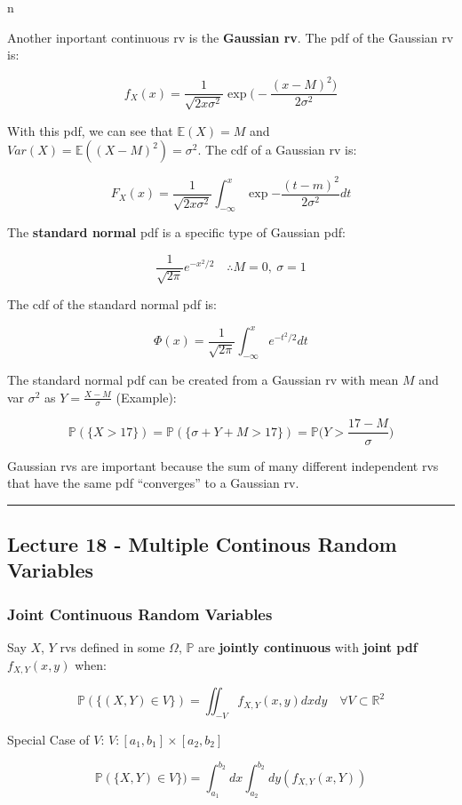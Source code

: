 n\documentclass{article}
\begin{document}
Another inportant continuous rv is the \textbf{Gaussian rv}. The pdf
of the Gaussian rv is:

\[
  f_X(x) = \frac{1} {\sqrt{2x\sigma^2}}
  \exp{\bigg(-\frac{(x-M)^2\bigg)} {2\sigma^2}}
\]

With this pdf, we can see that $\mathbb{E}(X) = M$ and $Var(X) =
\mathbb{E}((X-M)^2) = \sigma^2$. The cdf of a Gaussian rv is:

\[
  F_X(x) = \frac{1} {\sqrt{2x\sigma^2}} \int_{-\infty}^x
  \exp{-\frac{(t-m)^2}{2\sigma^2}} dt
\]

The \textbf{standard normal} pdf is a specific type of Gaussian pdf:

\[
  \frac{1}{\sqrt{2\pi}} e^{-x^2/2} \quad \therefore M=0, \ \sigma=1
\]

The cdf of the standard normal pdf is:

\[
  \Phi(x) = \frac{1}{\sqrt{2\pi}} \int_{-\infty}^x e^{-t^2/2} dt
\]

The standard normal pdf can be created from a Gaussian rv with mean
$M$ and var $\sigma^2$ as $Y=\frac{X-M}{\sigma}$ (Example):

\[
  \mathbb{P}(\{X>17\}) = \mathbb{P}(\{\sigma + Y + M > 17\}) =
  \mathbb{P}\Big(Y>\frac{17-M}{\sigma}\Big)
\]

Gaussian rvs are important because the sum of many different
independent rvs that have the same pdf ``converges'' to a Gaussian
rv.


\medskip\hrule
\subsection{Lecture 18 - Multiple Continous Random Variables}

\subsubsection{Joint Continuous Random Variables}

Say $X$, $Y$ rvs defined in some $\Omega$, $\mathbb{P}$ are
\textbf{jointly continuous} with \textbf{joint pdf} $f_{X,Y}(x,y)$
when:

\begin{equation}
  \tag{Jointly Continuous Definition}
  \boxed{
    \mathbb{P}(\{(X,Y)\in V\}) = \iint_{-V} f_{X,Y}(x,y) dx dy \quad
    \forall V \subset \mathbb{R}^2
  }
\end{equation}

Special Case of $V$: $V : [a_1,b_1] \times [a_2,b_2]$

\[
  \mathbb{P}(\{X,Y)\in V\}) = \int_{a_1}^{b_2}dx \int_{a_2}^{b_2}dy
  (f_{X,Y}(x,Y))
\]
\end{document}
